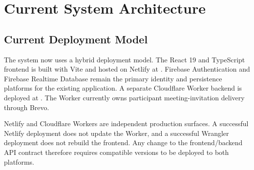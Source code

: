 \documentclass[11pt,a4paper,oneside]{report}
\begin{document}
\chapter{Current System Architecture}

\section{Current Deployment Model}

The system now uses a hybrid deployment model. The React 19 and TypeScript frontend is built with Vite and hosted on Netlify at . Firebase Authentication and Firebase Realtime Database remain the primary identity and persistence platforms for the existing application. A separate Cloudflare Worker backend is deployed at . The Worker currently owns participant meeting-invitation delivery through Brevo.

Netlify and Cloudflare Workers are independent production surfaces. A successful Netlify deployment does not update the Worker, and a successful Wrangler deployment does not rebuild the frontend. Any change to the frontend/backend API contract therefore requires compatible versions to be deployed to both platforms.
\end{document}

